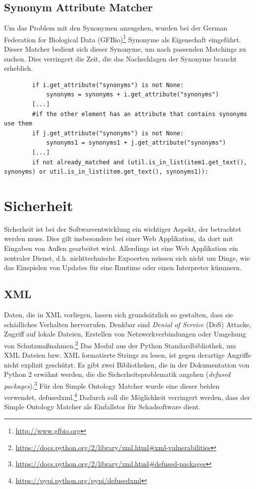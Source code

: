 		\subsection{Synonym Attribute Matcher}
		Um das Problem mit den Synonymen anzugehen, wurden bei der German Federation
		for Biological Data (GFBio)\footnote{\url{http://www.gfbio.org}} Synonyme als
		Eigenschaft eingeführt. Dieser Matcher bedient sich dieser Synonyme, um nach passenden
		Matchings zu suchen. Dies verringert die Zeit, die das Nachschlagen der
		Synonyme braucht erheblich.
		\begin{lstlisting}
		if i.get_attribute("synonyms") is not None:
            synonyms = synonyms + i.get_attribute("synonyms")
        [...]
        #if the other element has an attribute that contains synonyms use them
        if j.get_attribute("synonyms") is not None:
            synonyms1 = synonyms1 + j.get_attribute("synonyms")
        [...]
        if not already_matched and (util.is_in_list(item1.get_text(), synonyms) or util.is_in_list(item.get_text(), synonyms1)):
		\end{lstlisting}
		
		\section{Sicherheit}
		Sicherheit ist bei der Softwareentwicklung ein wichtiger Aspekt, der
		betrachtet werden muss. Dies gilt insbesondere bei einer Web Applikation, da
		dort mit Eingaben von Außen gearbeitet wird. Allerdings ist eine Web
		Applikation ein zentraler Dienst, d.h. nichttechnische Expoerten müssen sich
		nicht um Dinge, wie das Einspielen von Updates für eine Runtime oder einen
		Interpreter kümmern.
		
		\subsection{XML}
		Daten, die in XML vorliegen, lassen sich grundsätzlich so gestalten, dass sie
		schädliches Verhalten hervorrufen. Denkbar sind
		\textit{Denial of Service} (DoS) Attacke, Zugriff auf lokale Dateien,
		Erstellen von Netzwerkverbindungen oder Umgehung von
		Schutzmaßnahmen.\footnote{\url{https://docs.python.org/2/library/xml.html#xml-vulnerabilities}}
		Das Modul aus der Python Standardbibliothek, um XML Dateien bzw. XML
		formatierte Strings zu lesen, ist gegen derartige Angriffe nicht explizit
		geschützt. Es gibt zwei Bibliotheken, die in der Dokumentation von Python 2
		erwähnt werden, die die Sicherheitsproblematik angehen (\textit{defused
		packages}).\footnote{\url{https://docs.python.org/2/library/xml.html#defused-packages}}
		Für den Simple Ontology Matcher wurde eine dieser beiden verwendet, defusedxml.\footnote{\url{https://pypi.python.org/pypi/defusedxml}} Dadurch
		soll die Möglichkeit verringert werden, dass der Simple Ontology Matcher als
		Einfallstor für Schadsoftware dient.
		
